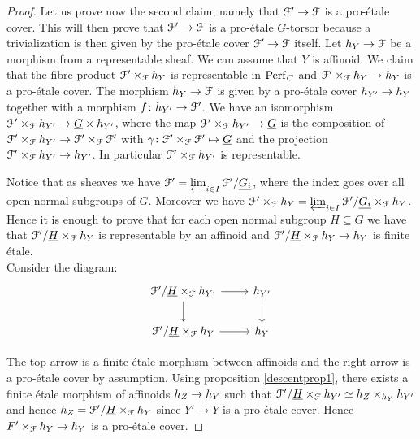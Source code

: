 \begin{proof}
Let us prove now the second claim, namely that $\mathcal{F}'\to\mathcal{F}$ is a pro-\'{e}tale cover. This will then prove that $\mathcal{F}'\to\mathcal{F}$ is a pro-\'{e}tale $\underline{G}$-torsor because a 
trivialization is then given by the pro-\'{e}tale cover $\mathcal{F}'\to\mathcal{F}$ itself. 
Let ${h_{Y}}\to\mathcal{F}$ be a morphism from a representable sheaf. We can assume that $Y$ is affinoid.
We claim that  the fibre product
$\mathcal{F}'\times_{\mathcal{F}}{h_{Y}}$ is representable in $\mathrm{Perf}_{C}$ and $\mathcal{F}'\times_{\mathcal{F}}{h_{Y}}\to {h_{Y}}$ is a pro-\'{e}tale cover.
The morphism ${h_{Y}}\to\mathcal{F}$ is given by a pro-\'{e}tale cover ${h_{Y'}}\to{h_{Y}}$ together with a morphism $f\colon{h_{Y'}}\to\mathcal{F}'$.
We have an isomorphism $\mathcal{F}'\times_{\mathcal{F}}{h_{Y'}}\to \underline{G}\times{h_{Y'}}$, where the map $\mathcal{F}'\times_{\mathcal{F}}{h_{Y'}}\to \underline{G}$ is the composition of
$\mathcal{F}'\times_{\mathcal{F}}{h_{Y'}}\to\mathcal{F}'\times_{\mathcal{F}}\mathcal{F}'$ with $\gamma\colon\mathcal{F}'\times_{\mathcal{F}}\mathcal{F}'\mapsto\underline{G}$ and the projection $\mathcal{F}'\times_{\mathcal{F}}{h_{Y'}}\to{h_{Y'}}$.
In particular $\mathcal{F}'\times_{\mathcal{F}}{h_{Y'}}$ is representable.

Notice that as sheaves we have $\mathcal{F}' = \varprojlim_{i\in I}\mathcal{F}'/\underline{G_i}$, where the index goes over all open normal subgroups of $G$. Moreover we have
$\mathcal{F}'\times_{\mathcal{F}}{h_{Y}} = \varprojlim_{i\in I}\mathcal{F}'/\underline{G_i}\times_{\mathcal{F}}{h_{Y}}$. Hence it is enough to prove that for each open normal subgroup $H\subseteq G$ we have that
$\mathcal{F}'/\underline{H}\times_{\mathcal{F}}{h_{Y}}$ is representable by an affinoid and $\mathcal{F}'/\underline{H}\times_{\mathcal{F}}{h_{Y}}\to{h_{Y}}$ is finite \'{e}tale.\\
Consider the diagram:
$$\begin{tikzcd}
\F'/\underline{H}\times_{\F}\h{Y'}		 \arrow[d] \arrow[r] & \h{Y'} \arrow[d]\\
\F'/\underline{H}\times_{\F}\h{Y}		 \arrow[r]	    & \h{Y}
\end{tikzcd}$$

The top arrow is a finite \'{e}tale morphism between affinoids and the right arrow is  a pro-\'{e}tale cover by assumption. Using proposition \ref{descentprop1}, there exists
a finite \'{e}tale morphism of affinoids ${h_{Z}}\to{h_{Y}}$ such that $\mathcal{F}'/\underline{H}\times_{\mathcal{F}}{h_{Y'}}\simeq {h_{Z}}\times_{{h_{Y}}}{h_{Y'}}$ and hence
${h_{Z}}= \mathcal{F}'/\underline{H}\times_{\mathcal{F}}{h_{Y}}$ since $Y'\to Y$ is a pro-\'{e}tale cover. Hence $F'\times_{\mathcal{F}}{h_{Y}}\to{h_{Y}}$  is a pro-\'{e}tale cover.
\end{proof}


